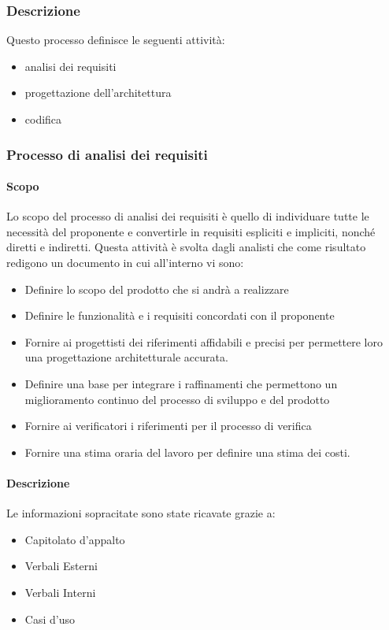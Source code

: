 \subsubsection{Descrizione}
Questo processo definisce le seguenti attività:
\begin{itemize}
  \item analisi dei requisiti
  \item progettazione dell'architettura
  \item codifica
\end{itemize}
\subsubsection{Processo di analisi dei requisiti}
\paragraph{Scopo}
Lo scopo del processo di analisi dei requisiti è quello di individuare tutte le necessità del proponente e convertirle in requisiti espliciti e impliciti, nonché diretti e indiretti. Questa attività è svolta dagli analisti che come risultato redigono un documento in cui all'interno vi sono:
\begin{itemize}
  \item Definire lo scopo del prodotto che si andrà a realizzare
  \item Definire le funzionalità e i requisiti concordati con il proponente
  \item Fornire ai progettisti dei riferimenti affidabili e precisi per permettere loro una progettazione architetturale accurata.
  \item Definire una base per integrare i raffinamenti che permettono un miglioramento continuo del processo di sviluppo e del prodotto
  \item Fornire ai verificatori i riferimenti per il processo di verifica
  \item Fornire una stima oraria del lavoro per definire una stima dei costi.
\end{itemize}

\paragraph{Descrizione}
Le informazioni sopracitate sono state ricavate grazie a:
\begin{itemize}
  \item Capitolato d'appalto
  \item Verbali Esterni
  \item Verbali Interni
  \item Casi d'uso
\end{itemize}

